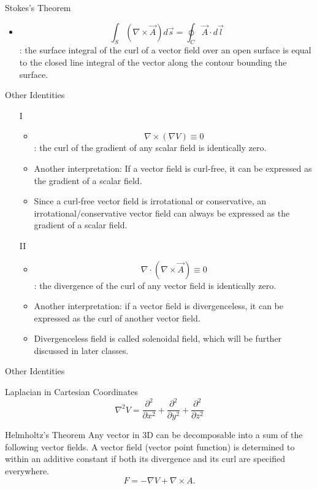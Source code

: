 \documentclass[xcolor={dvipsnames}]{beamer}
\begin{document}
\begin{frame}{Stokes's Theorem}
\begin{itemize}
    \item $$\int_S(\nabla\times\vec{A})d\vec{s}=\oint_C\vec{A}\cdot d\vec{l}$$: the surface integral of the curl of a vector field over an open surface is equal to the closed line integral of the vector along the contour bounding the surface.
\end{itemize}
\end{frame}
\begin{frame}{Other Identities}
\begin{itemize}
    \item[I]
    \begin{itemize}
        \item $$\nabla\times(\nabla V) \equiv 0$$: the curl of the gradient of any scalar field is identically zero.
        \item Another interpretation: If a vector field is curl-free, it can be expressed as the gradient of a scalar field.
        \item Since a curl-free vector field is irrotational or conservative, an irrotational/conservative vector field can always be expressed as the gradient of a scalar field.
    \end{itemize} 
    \item[II]\begin{itemize}
        \item $$\nabla\cdot(\nabla\times\vec{A})\equiv0$$: the divergence of the curl of any vector field is identically zero.
        \item Another interpretation: if a vector field is divergenceless, it can be expressed as the curl of another vector field.
        \item Divergenceless field is called solenoidal field, which will be further discussed in later classes.
    \end{itemize}
\end{itemize}
\end{frame}
\begin{frame}{Other Identities}
\begin{block}{Laplacian in Cartesian Coordinates}
$$\nabla^2 V = \frac{\partial^2 }{\partial x^2}+\frac{\partial^2 }{\partial y^2}+\frac{\partial^2 }{\partial z^2}$$
\end{block}
\pause
\begin{block}{Helmholtz's Theorem}
Any vector in 3D can be decomposable into a sum of the following vector fields. A vector field (vector point function) is determined to within an additive constant if both its divergence and its curl are specified everywhere.
$$F=-\nabla V+\nabla\times A.$$
\end{block}
\end{frame}
\end{document}
